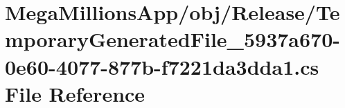 \hypertarget{obj_2_release_2_temporary_generated_file__5937a670-0e60-4077-877b-f7221da3dda1_8cs}{}\section{Mega\+Millions\+App/obj/\+Release/\+Temporary\+Generated\+File\+\_\+5937a670-\/0e60-\/4077-\/877b-\/f7221da3dda1.cs File Reference}
\label{obj_2_release_2_temporary_generated_file__5937a670-0e60-4077-877b-f7221da3dda1_8cs}
